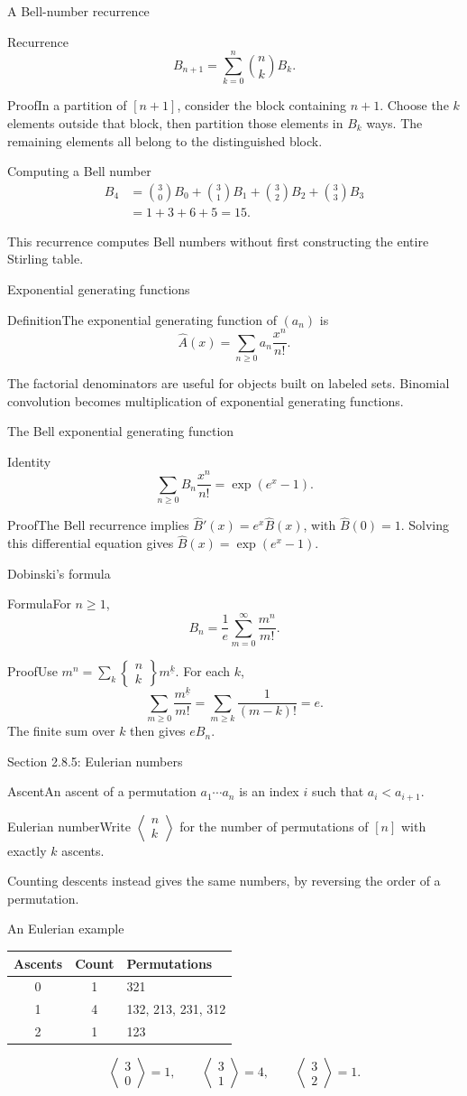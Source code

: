 \documentclass[aspectratio=169,11pt]{beamer}
\newcommand{\Def}[2]{\begin{block}{#1}#2\end{block}}
\newcommand{\Thm}[2]{\begin{block}{#1}#2\end{block}}
\renewcommand{\Proof}[1]{\begin{block}{Proof}\normalsize #1\end{block}}
\newcommand{\fall}[2]{#1^{\underline{#2}}}
\newcommand{\stir}[2]{\left\{\begin{matrix}#1\\#2\end{matrix}\right\}}
\newcommand{\eul}[2]{\left\langle\begin{matrix}#1\\#2\end{matrix}\right\rangle}
\newcommand{\gap}{\par\medskip}
\begin{document}
\begin{frame}{A Bell-number recurrence}
\large
\Thm{Recurrence}{\[B_{n+1}=\sum_{k=0}^n\binom nkB_k.\]}
\Proof{In a partition of $[n+1]$, consider the block containing $n+1$. Choose the $k$ elements outside that block, then partition those elements in $B_k$ ways. The remaining elements all belong to the distinguished block.}
\end{frame}
\begin{frame}{Computing a Bell number}
\large
\begin{align*}
B_4&=\binom30B_0+\binom31B_1+\binom32B_2+\binom33B_3\\
&=1+3+6+5=15.
\end{align*}
\gap This recurrence computes Bell numbers without first constructing the entire Stirling table.
\end{frame}
\begin{frame}{Exponential generating functions}
\large
\Def{Definition}{The exponential generating function of $(a_n)$ is
\[\widehat A(x)=\sum_{n\geq0}a_n\frac{x^n}{n!}.\]}
\gap The factorial denominators are useful for objects built on labeled sets. Binomial convolution becomes multiplication of exponential generating functions.
\end{frame}
\begin{frame}{The Bell exponential generating function}
\large
\Thm{Identity}{\[\sum_{n\geq0}B_n\frac{x^n}{n!}=\exp(e^x-1).\]}
\Proof{The Bell recurrence implies $\widehat B'(x)=e^x\widehat B(x)$, with $\widehat B(0)=1$. Solving this differential equation gives $\widehat B(x)=\exp(e^x-1)$.}
\end{frame}
\begin{frame}{Dobinski's formula}
\large
\Thm{Formula}{For $n\geq1$,
\[B_n=\frac1e\sum_{m=0}^{\infty}\frac{m^n}{m!}.\]}
\Proof{Use $m^n=\sum_k\stir nk\fall mk$. For each $k$,
\[\sum_{m\geq0}\frac{\fall mk}{m!}=\sum_{m\geq k}\frac1{(m-k)!}=e.\]
The finite sum over $k$ then gives $eB_n$.}
\end{frame}
\begin{frame}{Section 2.8.5: Eulerian numbers}
\large
\Def{Ascent}{An ascent of a permutation $a_1\cdots a_n$ is an index $i$ such that $a_i<a_{i+1}$.}
\Def{Eulerian number}{Write $\eul nk$ for the number of permutations of $[n]$ with exactly $k$ ascents.}
\gap Counting descents instead gives the same numbers, by reversing the order of a permutation.
\end{frame}
\begin{frame}{An Eulerian example}
\large
\begin{center}\renewcommand{\arraystretch}{1.5}
\begin{tabular}{ccl}
Ascents & Count & Permutations\\\hline
0&1&321\\
1&4&132, 213, 231, 312\\
2&1&123
\end{tabular}\end{center}
\[\eul30=1,\qquad\eul31=4,\qquad\eul32=1.\]
\end{frame}
\end{document}
